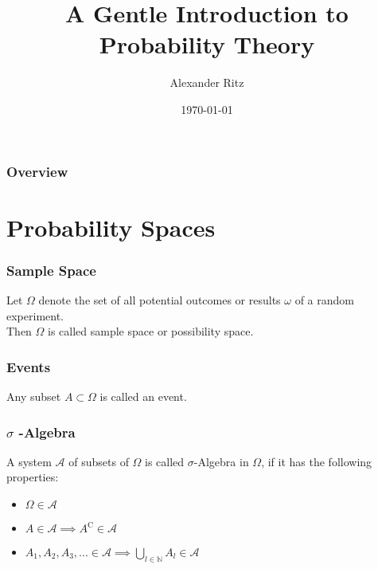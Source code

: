 \documentclass{beamer}
\title[Advanced Statistical Inference]{A Gentle Introduction to Probability Theory} %
\author{Alexander Ritz} %
\institute[University of Göttingen] %
{
University of Göttingen \\ %
\medskip

}
\date{\today} %
\begin{document}
\begin{frame}
\titlepage %
\end{frame}

\begin{frame}
\frametitle{Overview} %
\tableofcontents %
\end{frame}



\section{Probability Spaces} 
\frame{\sectionpage}

\begin{frame}
\frametitle{Sample Space}

Let $\Omega$ denote the set of all potential outcomes or results $\omega$ of a random experiment.\\
Then $\Omega$ is called sample space or possibility space. 

\end{frame}


\begin{frame}
\frametitle{Events}

Any subset  $ A \subset \Omega $ is called an event.

\end{frame}


\begin{frame}
\frametitle{$\sigma$ -Algebra}

A system $\mathscr{A}$ of subsets of $\Omega$ is called $\sigma$-Algebra in $\Omega$, if it has the following properties:
\newline
\begin{itemize}
\pause
\item{$\Omega \in \mathscr{A}$}
\pause
\item{$A \in \mathscr{A} \implies A^{\mathrm{C}} \in \mathscr{A}$}
\pause
\item{$A_1, A_2, A_3, ... \in \mathscr{A} \implies \bigcup\limits_{l \in \mathbb{N}} A_l \in \mathscr{A}$}
\end{itemize}

\end{frame}
\end{document}
